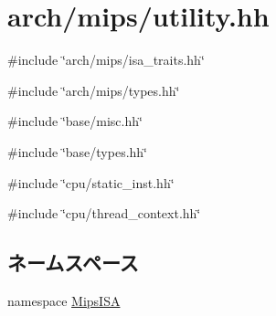 \hypertarget{mips_2utility_8hh}{
\section{arch/mips/utility.hh}
\label{mips_2utility_8hh}
}
{\ttfamily \#include \char`\"{}arch/mips/isa\_\-traits.hh\char`\"{}}\par
{\ttfamily \#include \char`\"{}arch/mips/types.hh\char`\"{}}\par
{\ttfamily \#include \char`\"{}base/misc.hh\char`\"{}}\par
{\ttfamily \#include \char`\"{}base/types.hh\char`\"{}}\par
{\ttfamily \#include \char`\"{}cpu/static\_\-inst.hh\char`\"{}}\par
{\ttfamily \#include \char`\"{}cpu/thread\_\-context.hh\char`\"{}}\par
\subsection*{ネームスペース}
\begin{DoxyCompactItemize}
\item 
namespace \hyperlink{namespaceMipsISA}{MipsISA}
\end{DoxyCompactItemize}
